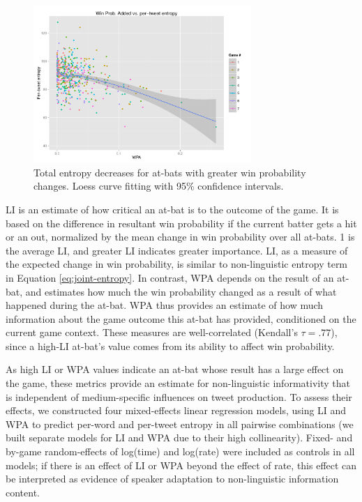 \documentclass[11pt,letterpaper]{article}
\begin{document}
\begin{figure}
 \centering
  \includegraphics[width=3.25in]{figures/final-wpa-tent-agg}
 \caption{Total entropy decreases for at-bats with greater win probability changes. Loess curve fitting with 95\% confidence intervals.}\label{fig:wpa-tent-agg}\vspace*{-.5em}
\end{figure}


LI is an estimate of how critical an at-bat is to the outcome of the game.  It is based on the difference in resultant win probability if the current batter gets a hit or an out, normalized by the mean change in win probability over all at-bats. 1 is the average LI, and greater LI indicates greater importance.  LI, as a measure of the expected change in win probability, is similar to non-linguistic entropy term in Equation \ref{eq:joint-entropy}.  In contrast, WPA depends on the result of an at-bat, and estimates how much the win probability changed as a result of what happened during the at-bat.  WPA thus provides an estimate of how much information about the game outcome this at-bat has provided, conditioned on the current game context.  These measures are well-correlated (Kendall's $\tau=.77$), since a high-LI at-bat's value comes from its ability to affect win probability.

As high LI or WPA values indicate an at-bat whose result has a large effect on the game, these metrics provide an estimate for non-linguistic informativity that is independent of medium-specific influences on tweet production.  To assess their effects, we constructed four mixed-effects linear regression models, using LI and WPA to predict per-word and per-tweet entropy in all pairwise combinations (we built separate models for LI and WPA due to their high collinearity). Fixed- and by-game random-effects of log(time) and log(rate) were included as controls in all models; if there is an effect of LI or WPA beyond the effect of rate, this effect can be interpreted as evidence of speaker adaptation to non-linguistic information content.
\end{document}
